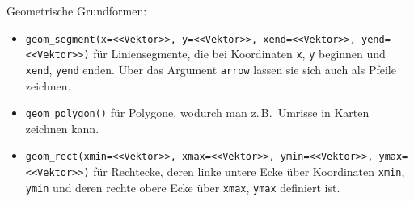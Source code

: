 Geometrische Grundformen:
\begin{itemize}
\item {} \lstinline!geom_segment(x=<<Vektor>>, y=<<Vektor>>, xend=<<Vektor>>, yend=<<Vektor>>)! für Liniensegmente, die bei Koordinaten \lstinline!x!, \lstinline!y! beginnen und \lstinline!xend!, \lstinline!yend! enden. Über das Argument \lstinline!arrow! lassen sie sich auch als Pfeile zeichnen.
\item {} \lstinline!geom_polygon()! für Polygone, wodurch man z.\,B.\ Umrisse in Karten zeichnen kann.
\item {} \lstinline!geom_rect(xmin=<<Vektor>>, xmax=<<Vektor>>, ymin=<<Vektor>>, ymax=<<Vektor>>)! für Rechtecke, deren linke untere Ecke über Koordinaten \lstinline!xmin!, \lstinline!ymin! und deren rechte obere Ecke über \lstinline!xmax!, \lstinline!ymax! definiert ist.
\end{itemize}


